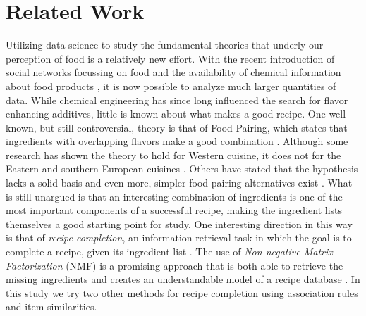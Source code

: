 \section{Related Work}
\label{sec:related_work}

Utilizing data science to study the fundamental theories that underly our perception of food is a relatively new effort.
With the recent introduction of social networks focussing on food and the availability of chemical information about food products \citep{FooDB}, it is now possible to analyze much larger quantities of data.
While chemical engineering has since long influenced the search for flavor enhancing additives, little is known about what makes a good recipe.
One well-known, but still controversial, theory is that of Food Pairing\textsuperscript{\textregistered}, which states that ingredients with overlapping flavors make a good combination \citep{FoodPairing}.
Although some research has shown the theory to hold for Western cuisine, it does not for the Eastern and southern European cuisines \citep{Ahn2011, Jain2015}.
Others have stated that the hypothesis lacks a solid basis and even more, simpler food pairing alternatives exist \citep{Klepper2011}.
What is still unargued is that an interesting combination of ingredients is one of the most important components of a successful recipe, making the ingredient lists themselves a good starting point for study.
One interesting direction in this way is that of \emph{recipe completion}, an information retrieval task in which the goal is to complete a recipe, given its ingredient list \citep{Clercq2016}.
The use of \emph{Non-negative Matrix Factorization} (NMF) is a promising approach that is both able to retrieve the missing ingredients and creates an understandable model of a recipe database \citep{Zetlaoui2011, Clercq2016}.
In this study we try two other methods for recipe completion using association rules and item similarities.
